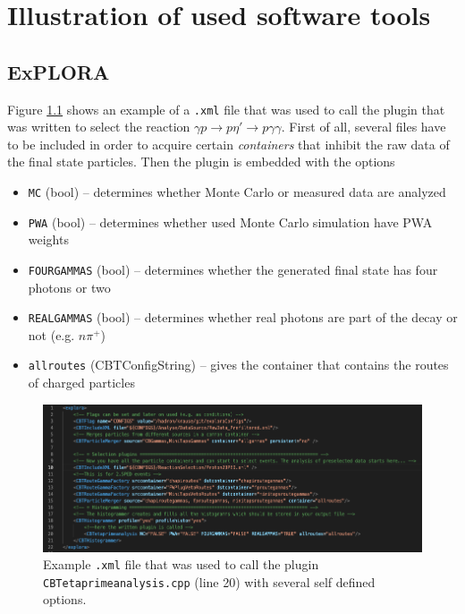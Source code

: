 \chapter{Illustration of used software tools}
\label{app:soft}
\section{ExPLORA}
Figure \ref{fig:xml} shows an example of a \texttt{.xml} file that was used to call the plugin that was written to select the reaction $\gamma p\to p\eta'\to p\gamma\gamma$. First of all, several files have to be included in order to acquire certain \emph{containers} that inhibit the raw data of the final state particles. Then the plugin is embedded with the options 
\begin{itemize}
	\item \texttt{MC} (bool) -- determines whether Monte Carlo or measured data are analyzed 
	\item \texttt{PWA} (bool) -- determines whether used Monte Carlo simulation have PWA weights
	\item \texttt{FOURGAMMAS} (bool) -- determines whether the generated final state has four photons or two
	\item \texttt{REALGAMMAS} (bool) -- determines whether real photons are part of the decay or not (e.g. $n\pi^+$)
	\item \texttt{allroutes} (CBTConfigString) -- gives the container that contains the routes of charged particles
\end{itemize}
\begin{figure}[htbp]
	\centering
	\includegraphics[width=\linewidth]{../demonstration/new_gg.png}
	\caption{Example \texttt{.xml} file that was used to call the plugin \texttt{CBTetaprimeanalysis.cpp} (line 20) with several self defined options.}
	\label{fig:xml}
\end{figure}
